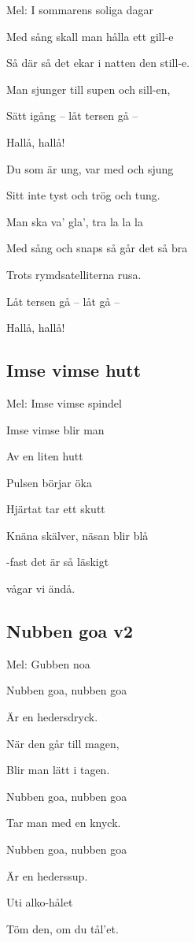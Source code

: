 Mel: I sommarens soliga dagar\bigskip

Med sång skall man hålla ett gill-e

Så där så det ekar i natten den still-e.

Man sjunger till supen och sill-en,

Sätt igång – låt tersen gå –

Hallå, hallå!

Du som är ung, var med och sjung

Sitt inte tyst och trög och tung.

Man ska va’ gla’, tra la la la

Med sång och snaps så går det så bra

Trots rymdsatelliterna rusa.

Låt tersen gå – låt gå –

Hallå, hallå!

\subsection{\textbf{Imse vimse hutt}}

Mel: Imse vimse spindel\bigskip

Imse vimse blir man

Av en liten hutt

Pulsen börjar öka

Hjärtat tar ett skutt

Knäna skälver, näsan blir blå

-fast det är så läskigt

vågar vi ändå.

\subsection{\textbf{Nubben goa v2}}

Mel: Gubben noa\bigskip


Nubben goa, nubben goa

Är en hedersdryck.

När den går till magen,

Blir man lätt i tagen.

Nubben goa, nubben goa

Tar man med en knyck.\bigskip

Nubben goa, nubben goa

Är en hederssup.

Uti alko-hålet

Töm den, om du tål’et.

